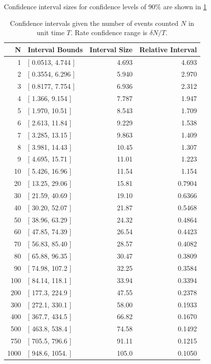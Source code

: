 \documentclass{article}
\begin{document}
Confidence interval sizes for confidence levels of 90\% are shown in \ref{tab:conf}

\begin{table}
    \begin{tabular}{r|l|r|r}
     \hline
N & Interval Bounds & Interval Size & Relative Interval\\ 
\hline 
1 &  [ 0.0513, 4.744 ] & 4.693 & 4.693\\ 
2 &  [ 0.3554, 6.296 ] & 5.940 & 2.970\\ 
3 &  [ 0.8177, 7.754 ] & 6.936 & 2.312\\ 
4 &  [ 1.366, 9.154 ] & 7.787 & 1.947\\ 
5 &  [ 1.970, 10.51 ] & 8.543 & 1.709\\ 
6 &  [ 2.613, 11.84 ] & 9.229 & 1.538\\ 
7 &  [ 3.285, 13.15 ] & 9.863 & 1.409\\ 
8 &  [ 3.981, 14.43 ] & 10.45 & 1.307\\ 
9 &  [ 4.695, 15.71 ] & 11.01 & 1.223\\ 
10 &  [ 5.426, 16.96 ] & 11.54 & 1.154\\ 
20 &  [ 13.25, 29.06 ] & 15.81 & 0.7904\\ 
30 & [ 21.59, 40.69 ] & 19.10 & 0.6366\\ 
40 & [ 30.20, 52.07 ] & 21.87 & 0.5468\\ 
50 & [ 38.96, 63.29 ] & 24.32 & 0.4864\\ 
60 & [ 47.85, 74.39 ] & 26.54 & 0.4423\\ 
70 & [ 56.83, 85.40 ] & 28.57 & 0.4082\\ 
80 & [ 65.88, 96.35 ] & 30.47 & 0.3809\\ 
90 & [ 74.98, 107.2 ] & 32.25 & 0.3584\\ 
100 & [ 84.14, 118.1 ] & 33.94 & 0.3394\\ 
200 & [ 177.3, 224.9 ] & 47.55 & 0.2378\\ 
300 & [ 272.1, 330.1 ] & 58.00 & 0.1933\\ 
400 & [ 367.7, 434.5 ] & 66.82 & 0.1670\\ 
500 & [ 463.8, 538.4 ] & 74.58 & 0.1492\\ 
750 & [ 705.5, 796.6 ] & 91.11 & 0.1215\\ 
1000 & [ 948.6,  1054. ] & 105.0 & 0.1050\\ 
\end{tabular}
\caption{Confidence intervals given the number of events counted $N$ in unit time $T$.  Rate confidence range is $\delta N/T$.}
\label{tab:conf}
\end{table}
\end{document}
